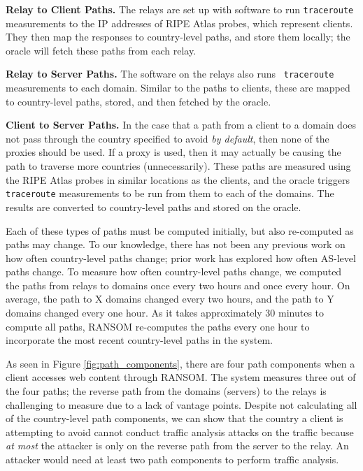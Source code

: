 {\bf Relay to Client Paths.} The relays are set up with software to run 
{\tt traceroute} measurements to the IP addresses of RIPE Atlas probes, which 
represent clients.  They then map the responses to country-level paths, and 
store them locally; the oracle will fetch these paths from each relay. 

{\bf Relay to Server Paths.} The software on the relays also runs {\tt 
traceroute} measurements to each domain.  Similar to the paths to clients, these 
are mapped to country-level paths, stored, and then fetched by the oracle.

{\bf Client to Server Paths.} In the case that a path from a client to a 
domain does not pass through the country specified to avoid {\it by default}, 
then none of the proxies should be used.  If a proxy is used, then it may 
actually be causing the path to traverse more countries (unnecessarily).  These 
paths are measured using the RIPE Atlas probes in similar locations as the 
clients, and the oracle triggers {\tt traceroute} measurements to be run from 
them to each of the domains.  The results are converted to country-level paths 
and stored on the oracle.  

Each of these types of paths must be computed initially, but also re-computed 
as paths may change.  To our knowledge, there has not been any previous work 
on how often country-level paths change; prior work has explored how often 
AS-level paths change.  To measure how often country-level paths change, we 
computed the paths from relays to domains once every two hours and once every 
hour.  On average, the path to X domains changed every two hours, and the path 
to Y domains changed every one hour.  As it takes approximately 30 minutes to 
compute all paths, RANSOM re-computes the paths every one hour to incorporate 
the most recent country-level paths in the system.

As seen in Figure \ref{fig:path_components}, there are four path components 
when a client accesses web content through RANSOM.  The system measures three 
out of the four paths; the reverse path from the domains (servers) to the relays 
is challenging to measure due to a lack of vantage points.  Despite not 
calculating all of the country-level path components, we can show that the 
country a client is attempting to avoid cannot conduct traffic analysis attacks 
on the traffic because {\it at most} the attacker is only on the reverse path 
from the server to the relay.  An attacker would need at least two path 
components to perform traffic analysis. 

